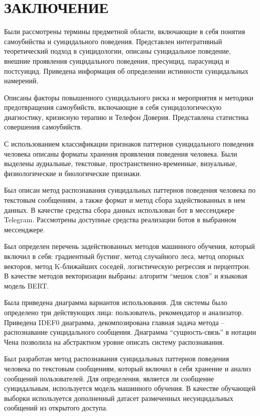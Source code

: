 \section*{ЗАКЛЮЧЕНИЕ}

Были рассмотрены термины предметной области, включающие в себя понятия самоубийства и суицидального поведения. 
Представлен интегративный теоретический подход в суицидологии, описаны суицидальное поведение, внешние проявления суицидального поведения, пресуицид, парасуицид и постсуицид. 
Приведена информация об определении истинности суицидальных намерений. 

Описаны факторы повышенного суицидального риска и мероприятия и методики предотвращения самоубийств, включающие в себя суицидологическую диагностику, кризисную терапию и Телефон Доверия.
Представлена статистика совершения самоубийств.

С использованием классификации признаков паттернов суицидального поведения человека описаны форматы хранения проявления поведения человека. 
Были выделены аудиальные, текстовые, пространственно-временные, визуальные, физиологические и биологические признаки.

Был описан метод распознавания суицидальных паттернов поведения человека по текстовым сообщениям, а также формат и метод сбора задействованных в нем данных. 
В качестве средства сбора данных использован бот в мессенджере Telegram. Рассмотрены доступные средства реализации ботов в выбранном мессенджере.

Был определен перечень задействованных методов машинного обучения, который включил в себя: градиентный бустинг, метод случайного леса, метод опорных векторов, метод K-ближайших соседей, логистическую регрессия и перцептрон. В качестве методов векторизации выбраны: алгоритм ``мешок слов'' и языковая модель BERT.

Была приведена диаграмма вариантов использования. Для системы было определено три действующих лица: пользователь, рекомендатор и анализатор. 
Приведена IDEF0 диаграмма, декомпозирована главная задача метода -- распознавание суицидального сообщения. 
Диаграмма ``сущность-связь'' в нотации Чена позволила на абстрактном уровне описать систему распознавания.

Был разработан метод распознавания суицидальных паттернов поведения человека по текстовым сообщениям, который включил в себя хранение и анализ сообщений пользователей.
Для определения, является ли сообщение суицидальным, используется модель машинного обучения. В качестве обучающей выборки используется дополненный датасет размеченных несуицидальных сообщений из открытого доступа.

